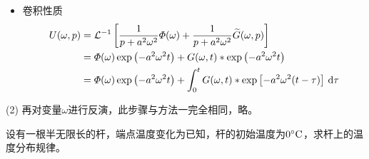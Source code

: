 \begin{enumerate}
\begin{itemize}
		\item 卷积性质
		\begin{align}
			U(\omega, p) &= \mathcal{L}^{-1}\left[\dfrac{1}{p + a^2 \omega^2}\varPhi(\omega) + \dfrac{1}{p + a^2 \omega^2} \widetilde{G}(\omega, p)\right] \notag\\
			& = \varPhi(\omega) \exp\left(-a^2 \omega^2 t\right) + G(\omega, t)*\exp\left(-a^2 \omega^2 t\right) \notag\\
			& = \varPhi(\omega) \exp\left(-a^2 \omega^2 t\right) + \int_0^t G(\omega, t)*\exp\left[-a^2 \omega^2 (t - \tau)\right]\, {\rm{d}} \tau
		\end{align}
	\end{itemize}
	(2) 再对变量$\omega$进行反演，此步骤与方法一完全相同，略。
\end{enumerate}
\vspace*{4em}

\example[半无界杆上的热传导问题]
设有一根半无限长的杆，端点温度变化为已知，杆的初始温度为$0{}^{\circ} \text{C}$，求杆上的温度分布规律。

